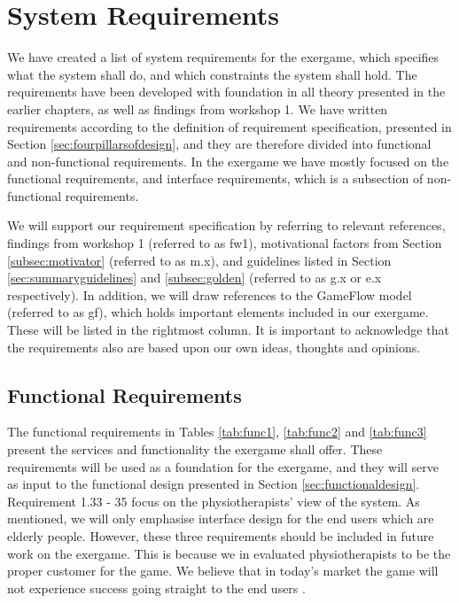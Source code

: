 \newpage
\section{System Requirements}
\label{sec:req}
We have created a list of system requirements for the exergame, which specifies what the system shall do, and which constraints the system shall hold. The requirements have been developed with foundation in all theory presented in the earlier chapters, as well as findings from workshop 1. We have written requirements according to the definition of requirement specification, presented in Section \ref{sec:fourpillarsofdesign}, and they are therefore divided into functional and non-functional requirements. In the exergame we have mostly focused on the functional requirements, and interface requirements, which is a subsection of non-functional requirements. 

We will support our requirement specification by referring to relevant references, findings from workshop 1 (referred to as fw1), motivational factors from Section \ref{subsec:motivator} (referred to as m.x), and guidelines listed in Section \ref{sec:summaryguidelines} and \ref{subsec:golden} (referred to as g.x or e.x respectively). In addition, we will draw references to the GameFlow model \cite{sweetser} (referred to as gf), which holds important elements included in our exergame. These will be listed in the rightmost column. It is important to acknowledge that the requirements also are based upon our own ideas, thoughts and opinions. 

\subsection{Functional Requirements}
The functional requirements in Tables \ref{tab:func1}, \ref{tab:func2} and \ref{tab:func3} present the services and functionality the exergame shall offer. These requirements will be used as a foundation for the exergame, and they will serve as input to the functional design presented in Section \ref{sec:functionaldesign}. Requirement 1.33 - 35 focus on the physiotherapists' view of the system. As mentioned, we will only emphasise interface design for the end users which are elderly people. However, these three requirements should be included in future work on the exergame. This is because we in \cite{project} evaluated physiotherapists to be the proper customer for the game. We believe that in today's market the game will not experience success going straight to the end users \cite{project}.  

